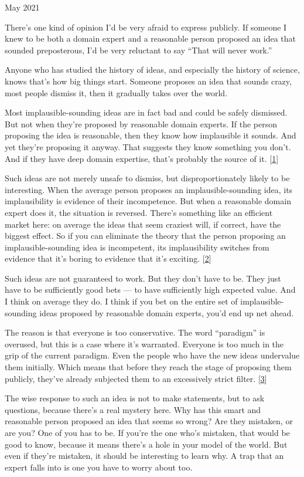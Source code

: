 May 2021

There's one kind of opinion I'd be very afraid to express publicly. If
someone I knew to be both a domain expert and a reasonable person
proposed an idea that sounded preposterous, I'd be very reluctant to say
``That will never work.''

Anyone who has studied the history of ideas, and especially the history
of science, knows that's how big things start. Someone proposes an idea
that sounds crazy, most people dismiss it, then it gradually takes over
the world.

Most implausible-sounding ideas are in fact bad and could be safely
dismissed. But not when they're proposed by reasonable domain experts.
If the person proposing the idea is reasonable, then they know how
implausible it sounds. And yet they're proposing it anyway. That
suggests they know something you don't. And if they have deep domain
expertise, that's probably the source of it. {[}\hyperref[f1n]{1}{]}

Such ideas are not merely unsafe to dismiss, but disproportionately
likely to be interesting. When the average person proposes an
implausible-sounding idea, its implausibility is evidence of their
incompetence. But when a reasonable domain expert does it, the situation
is reversed. There's something like an efficient market here: on average
the ideas that seem craziest will, if correct, have the biggest effect.
So if you can eliminate the theory that the person proposing an
implausible-sounding idea is incompetent, its implausibility switches
from evidence that it's boring to evidence that it's exciting.
{[}\hyperref[f2n]{2}{]}

Such ideas are not guaranteed to work. But they don't have to be. They
just have to be sufficiently good bets --- to have sufficiently high
expected value. And I think on average they do. I think if you bet on
the entire set of implausible-sounding ideas proposed by reasonable
domain experts, you'd end up net ahead.

The reason is that everyone is too conservative. The word ``paradigm''
is overused, but this is a case where it's warranted. Everyone is too
much in the grip of the current paradigm. Even the people who have the
new ideas undervalue them initially. Which means that before they reach
the stage of proposing them publicly, they've already subjected them to
an excessively strict filter. {[}\hyperref[f3n]{3}{]}

The wise response to such an idea is not to make statements, but to ask
questions, because there's a real mystery here. Why has this smart and
reasonable person proposed an idea that seems so wrong? Are they
mistaken, or are you? One of you has to be. If you're the one who's
mistaken, that would be good to know, because it means there's a hole in
your model of the world. But even if they're mistaken, it should be
interesting to learn why. A trap that an expert falls into is one you
have to worry about too.

